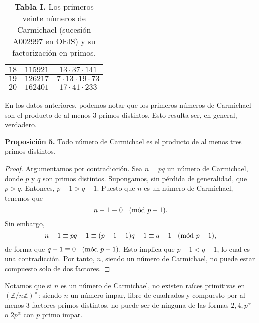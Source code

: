 \documentclass{article}
\theoremstyle{definition}
\newcommand{\Mod}[1]{\ \hspace{0.2cm} (\mathrm{m\acute{o}d}\ #1)}
\begin{document}
\begin{table}[h]
\begin{tabulary}{0.9\textwidth}{| C| C|C|}
	$18$ & $115921$  & $13 \cdot 37 \cdot 141$   \\  \hline
	
	$19$ & $126217$  & $7 \cdot 13 \cdot 19 \cdot 73$   \\  \hline
	
	$20$ & $162401$  & $17 \cdot 41 \cdot 233$   \\  \hline

	\end{tabulary}
\caption*{\textbf{Tabla I. } Los primeros veinte números de Carmichael (sucesión \href{https://oeis.org/A002997}{A002997} en OEIS) y su factorización en primos.  }
\end{table}	

	En los datos anteriores, podemos notar que los primeros números de Carmichael son el producto de al menos $3$ primos distintos. Esto resulta ser, en general, verdadero. 
	
\begin{mybox2}
\textbf{Proposición 5.} Todo número de Carmichael es el producto de al menos tres primos distintos. 
\end{mybox2}		 
\begin{proof}
Argumentamos por contradicción. Sea $n = pq$ un número de Carmichael, donde $p$ y $q$ son primos distintos. Supongamos, sin pérdida de generalidad, que $p > q$. Entonces, $ p -1 > q - 1$. Puesto que $n$ es un número de Carmichael, tenemos que
$$ n - 1 \equiv 0 \Mod{p-1} .$$	
Sin embargo,
$$ n -1 \equiv pq - 1 \equiv (p - 1 + 1)q - 1 \equiv q - 1 \Mod{p-1},  $$
de forma que $q - 1 \equiv 0 \Mod{p-1}.$ Esto implica que $p -1 < q - 1$, lo cual es una contradicción. Por tanto, $n$, siendo un número de Carmichael, no puede estar compuesto solo de dos factores. 
\end{proof}
\vspace{0.3cm}
Notamos  que si $n$ es un número de Carmichael, no existen raíces primitivas en $(\mathbb{Z} / n \mathbb{Z})^{\times}$: siendo $n$ un número impar, libre de cuadrados y compuesto por al menos $3$ factores primos distintos, no puede ser de ninguna de las formas $2, 4, p^{\alpha}$ o $2 p^{\alpha}$ con $p$ primo impar. 

\newpage
\end{document}
